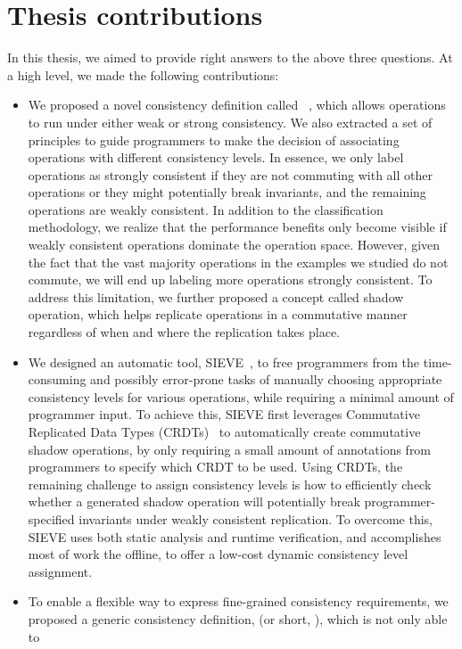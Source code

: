 \section{Thesis contributions}
In this thesis, we aimed to provide right answers to the above three questions. At 
a high level, we made
the following contributions:
\begin{itemize}
\item We proposed a novel consistency definition called 
\RBCN~\cite{Li2012RedBlue}, which allows
 operations to run under either weak or strong consistency. We also extracted a 
set of
 principles to guide programmers to make the decision of associating operations 
with different
 consistency levels. In essence, we only label operations as strongly consistent 
if they are not commuting with
 all other operations or they might potentially break invariants, and the 
remaining operations are
 weakly consistent. In addition to the classification methodology, we realize 
that the performance
 benefits only become visible if weakly consistent operations dominate the 
operation space. However, given
 the fact that the vast majority operations in the examples we studied do not
commute, we will end up labeling
 more operations strongly consistent. To address this limitation, we further 
proposed a concept called shadow operation,
 which helps replicate operations in a commutative manner regardless of when and 
where the replication takes place. 
\item  We designed an automatic tool, SIEVE~\cite{Li2014SIEVE}, to free 
programmers
 from the time-consuming and possibly error-prone tasks of manually choosing 
appropriate consistency levels for various operations, while requiring a minimal amount of 
programmer input. To achieve this,
 SIEVE first leverages Commutative Replicated Data Types 
(CRDTs)~\cite{Letia2009CRDTs} to
 automatically create commutative shadow operations, by only requiring a small 
amount of annotations from
 programmers to specify which CRDT to be used. Using CRDTs, the remaining challenge to 
assign consistency levels
 is how to efficiently check whether a generated shadow operation will 
potentially break programmer-specified invariants under weakly consistent 
replication. To overcome this, SIEVE uses both static analysis and 
runtime verification,
 and accomplishes most of work the offline, to offer a low-cost dynamic consistency 
level assignment.
 \item To enable a flexible way to express fine-grained consistency requirements, 
we proposed a generic consistency definition, \PRCNF(or short, \PRCN), which is not only able to 

\end{itemize}
